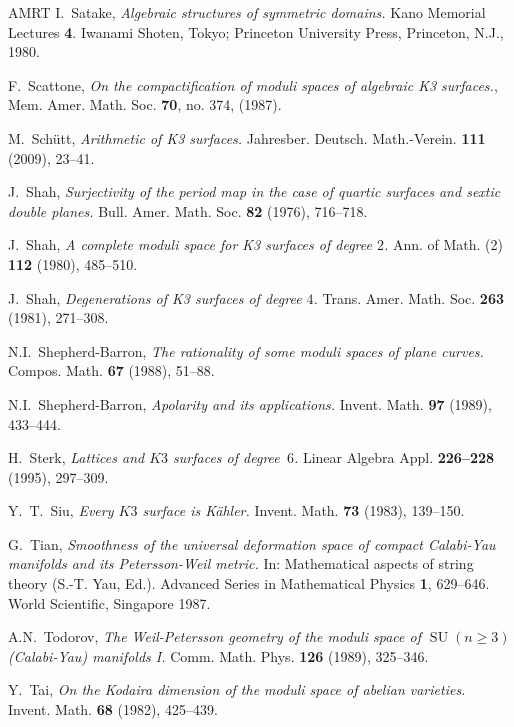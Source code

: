 \documentclass[a4paper,11pt]{article}
\newcommand{\SU}{\mathop{\mathrm {SU}}\nolimits}
\begin{document}
\begin{thebibliography}{AMRT}
 I.~Satake, {\it Algebraic structures of symmetric
  domains.} Kano Memorial Lectures {\bf 4}. Iwanami Shoten, Tokyo;
  Princeton University Press, Princeton, N.J., 1980.

 F.~Scattone, {\it On the compactification of moduli
  spaces of algebraic K3 surfaces.}, Mem. Amer. Math. Soc.  {\bf 70},
  no. 374, (1987).

 M.~Sch\"utt, {\it Arithmetic of K3 surfaces.}
  Jahresber. Deutsch. Math.-Verein. {\bf 111} (2009), 23--41.

 J.~Shah, {\it Surjectivity of the period map in
  the case of quartic surfaces and sextic double planes.}
  Bull. Amer. Math. Soc. {\bf 82} (1976), 716--718.

 J.~Shah, {\it A complete moduli space for K3
  surfaces of degree $2$.}  Ann. of Math. (2) {\bf 112} (1980),
  485--510.

 J.~Shah, {\it Degenerations of K3 surfaces of
  degree $4$.}  Trans. Amer. Math. Soc. {\bf 263} (1981), 271--308.

 N.I.~Shepherd-Barron, {\it The rationality of
  some moduli spaces of plane curves.} Compos. Math. {\bf 67} (1988),
  51--88.

 N.I.~Shepherd-Barron, {\it Apolarity and its
  applications.}  Invent. Math. {\bf 97} (1989), 433--444.

 H.~Sterk, {\it Lattices and $K3$ surfaces of
  degree~$6$.} Linear Algebra Appl. {\bf 226--228} (1995), 297--309.

 Y.~T.~Siu, {\it Every $K3$ surface is K\"ahler.}
  Invent. Math. {\bf 73} (1983), 139--150.

 G.~Tian, {\it Smoothness of the universal deformation
  space of compact Calabi-Yau manifolds and its Petersson-Weil
  metric.} In: Mathematical aspects of string theory (S.-T. Yau,
  Ed.). Advanced Series in Mathematical Physics {\bf 1},
  629--646. World Scientific, Singapore 1987.

 A.N.~Todorov, {\it The Weil-Petersson geometry of
  the moduli space of $\SU(n\geq 3)$ (Calabi-Yau) manifolds I.}
  Comm. Math. Phys. {\bf 126} (1989), 325--346.

 Y.~Tai, {\it On the Kodaira dimension of the moduli
    space of abelian varieties.} Invent. Math. {\bf 68} (1982),
  425--439.


\end{thebibliography}
\end{document}
